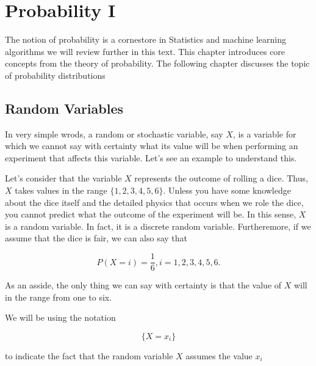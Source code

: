 \chapter{Probability I}
\label{probability_I}

The notion of probability is a cornestore in Statistics and machine learning algorithms we will
review further in this text. This chapter introduces core concepts from the theory of probability.
The following chapter discusses the topic of probability distributions 

\section{Random Variables}
\label{random_variables}

In very simple wrods, a random or stochastic variable, say $X$, is a variable for which we cannot
say with certainty what its value will be when performing an experiment that affects this variable.
Let's see an example to understand this.


\begin{framed}
\begin{example}

Let's consider that the variable $X$ represents the outcome of rolling a dice. Thus, $X$ takes values
in the range $\{1, 2, 3, 4, 5, 6\}$. Unless you have some knowledge about the dice itself and the 
detailed physics that occurs when we role the dice, you cannot predict what the outcome of the experiment 
will be. In this sense, $X$ is a random variable. In fact, it is a discrete random variable. Furtheremore,
if we assume that the dice is fair, we can also say that

\begin{equation}
P(X = i) = \frac{1}{6}, i=1, 2,3,4,5,6.
\end{equation}

As an asside, the only thing we can say with certainty is that the value of $X$ will in the range from one to six.
\end{example}
\end{framed}


\begin{framed}
\begin{remark}

We will be using the notation 

\begin{equation} 
\{X = x_i \} \nonumber
\end{equation}

to indicate the fact that the random variable $X$ assumes the value $x_i$ 
\end{remark}
\end{framed}

